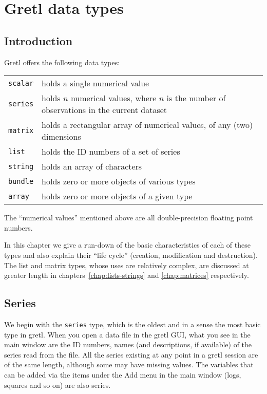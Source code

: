 \chapter{Gretl data types}
\label{chap:datatypes}

\section{Introduction}

Gretl offers the following data types:
%
\begin{center}
\begin{tabular}{lp{}}
  \texttt{scalar} & holds a single numerical value\\
  \texttt{series} & holds $n$ numerical values, where $n$
                    is the number of observations in the current dataset \\
  \texttt{matrix} & holds a rectangular array of numerical
                    values, of any (two) dimensions\\
  \texttt{list} & holds the ID numbers of a set of series \\
  \texttt{string} & holds an array of characters\\
  \texttt{bundle} & holds zero or more objects of 
                    various types \\
  \texttt{array} & holds zero or more objects of 
                   a given type
\end{tabular}
\end{center}

The ``numerical values'' mentioned above are all double-precision
floating point numbers.

In this chapter we give a run-down of the basic characteristics of
each of these types and also explain their ``life cycle'' (creation,
modification and destruction). The list and matrix types, whose uses
are relatively complex, are discussed at greater length in
chapters~\ref{chap:lists-strings} and \ref{chap:matrices}
respectively.

\section{Series}
\label{sec:Series}

We begin with the \texttt{series} type, which is the oldest and in a
sense the most basic type in gretl. When you open a data file in the
gretl GUI, what you see in the main window are the ID numbers, names
(and descriptions, if available) of the series read from the file. All
the series existing at any point in a gretl session are of the same
length, although some may have missing values. The variables that can
be added via the items under the \textsf{Add} menu in the main window
(logs, squares and so on) are also series.

